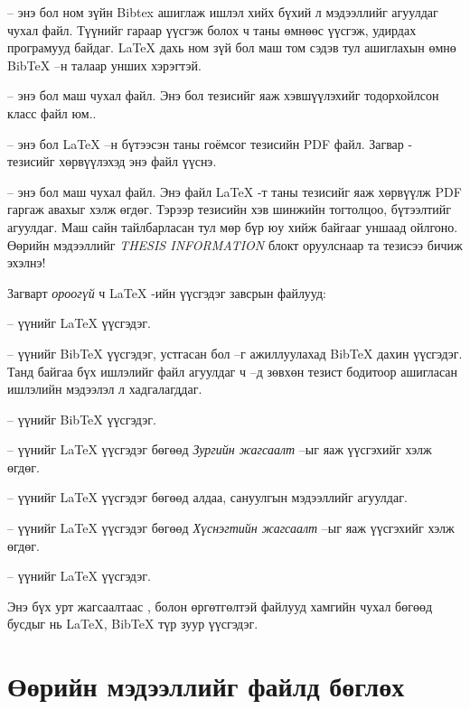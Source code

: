  -- энэ бол ном зүйн Bibtex ашиглаж ишлэл хийх бүхий л мэдээллийг агуулдаг чухал файл. Түүнийг гараар үүсгэж болох ч таны өмнөөс үүсгэж, удирдах програмууд байдаг. \LaTeX{} дахь ном зүй бол маш том сэдэв тул ашиглахын өмнө BibTeX --н талаар унших хэрэгтэй. 

 -- энэ бол маш чухал файл. Энэ бол тезисийг яаж хэвшүүлэхийг тодорхойлсон класс файл юм.. 

 -- энэ бол \LaTeX{} --н бүтээсэн таны гоёмсог тезисийн PDF файл. Загвар - тезисийг хөрвүүлэхэд энэ файл үүснэ.

 -- энэ бол маш чухал файл. Энэ файл \LaTeX{} -т таны тезисийг яаж хөрвүүлж PDF гаргаж авахыг хэлж өгдөг. Тэрээр тезисийн хэв шинжийн тогтолцоо, бүтээлтийг агуулдаг. Маш сайн тайлбарласан тул мөр бүр юу хийж байгааг уншаад ойлгоно. Өөрийн мэдээллийг \emph{THESIS INFORMATION} блокт оруулснаар та тезисээ бичиж эхэлнэ!

Загварт \emph{ороогүй} ч \LaTeX{} -ийн үүсгэдэг завсрын файлууд:

 -- үүнийг \LaTeX{} үүсгэдэг.

 -- үүнийг BibTeX үүсгэдэг, устгасан бол  --г ажиллуулахад BibTeX дахин үүсгэдэг. Танд байгаа бүх ишлэлийг  файл  агуулдаг ч  --д зөвхөн тезист бодитоор ашигласан ишлэлийн мэдээлэл л хадгалагддаг.

 -- үүнийг BibTeX үүсгэдэг.

 -- үүнийг \LaTeX{} үүсгэдэг бөгөөд \emph{Зургийн жагсаалт} --ыг яаж үүсгэхийг хэлж өгдөг.

 -- үүнийг \LaTeX{} үүсгэдэг бөгөөд алдаа, сануулгын мэдээллийг агуулдаг.

 -- үүнийг \LaTeX{} үүсгэдэг бөгөөд \emph{Хүснэгтийн жагсаалт} --ыг яаж үүсгэхийг хэлж өгдөг.

 -- үүнийг \LaTeX{} үүсгэдэг.

Энэ бүх урт жагсаалтаас ,  болон  өргөтгөлтэй файлууд хамгийн чухал бөгөөд бусдыг нь \LaTeX{}, BibTeX түр зуур үүсгэдэг.


\section{Өөрийн мэдээллийг  файлд бөглөх}\label{FillingFile}

